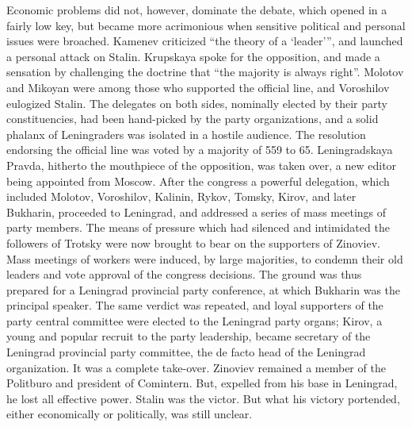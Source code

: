Economic problems did not, however, dominate the debate, which opened in a fairly low key, but became more acrimonious when sensitive political and personal issues were broached. Kamenev criticized ``the theory of a `leader''', and launched a personal attack on Stalin. Krupskaya spoke for the opposition, and made a sensation by challenging the doctrine that ``the majority is always right''. Molotov and Mikoyan were among those who supported the official line, and Voroshilov eulogized Stalin. The delegates on both sides, nominally elected by their party constituencies, had been hand-picked by the party organizations, and a solid phalanx of Leningraders was isolated in a hostile audience. The resolution endorsing the official line was voted by a majority of 559 to 65. Leningradskaya Pravda, hitherto the mouthpiece of the opposition, was taken over, a new editor being appointed from Moscow. After the congress a powerful delegation, which included Molotov, Voroshilov, Kalinin, Rykov, Tomsky, Kirov, and later Bukharin, proceeded to Leningrad, and addressed a series of mass meetings of party members. The means of pressure which had silenced and intimidated the followers of Trotsky were now brought to bear on the supporters of Zinoviev. Mass meetings of workers were induced, by large majorities, to condemn their old leaders and vote approval of the congress decisions. The ground was thus prepared for a Leningrad provincial party conference, at which Bukharin was the principal speaker. The same verdict was repeated, and loyal supporters of the party central committee were elected to the Leningrad party organs; Kirov, a young and popular recruit to the party leadership, became secretary of the Leningrad provincial party committee, the de facto head of the Leningrad organization. It was a complete take-over. Zinoviev remained a member of the Politburo and president of Comintern. But, expelled from his base in Leningrad, he lost all effective power. Stalin was the victor. But what his victory portended, either economically or politically, was still unclear.
